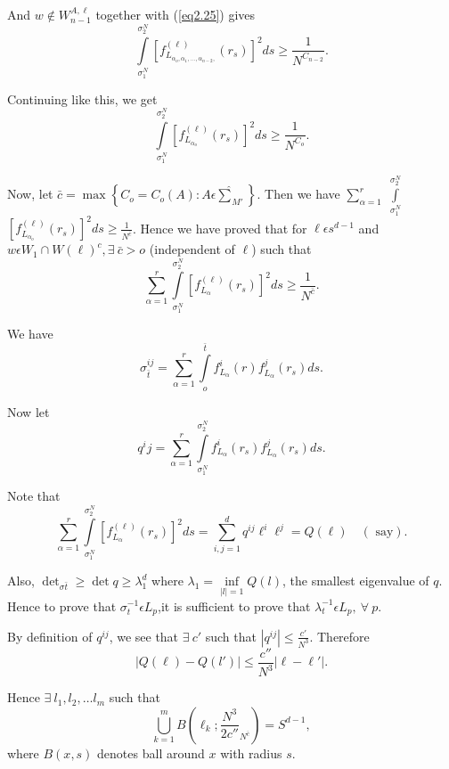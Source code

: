 And $w \notin W^{A,\ell}_{n-1}$ together with (\ref{eq2.25}) gives 
$$
\int\limits^{\sigma_2^N}_{\sigma^N_1} \left[f^{(\ell)}_{L_{\alpha_o, \alpha_1,
    \ldots, \alpha_{n -2},}} (r_s)\right]^2 ds \geq \frac{1}{N^{C_{n-2}}}. 
$$

Continuing like this, we get 
$$
\int\limits^{\sigma_2^N}_{\sigma^N_1} \left[f^{(\ell)}_{L_{\alpha_o}} (r_s)\right]^2
ds \geq \frac{1}{N^{C_{o}}}. 
$$\pageoriginale

Now, let $\bar{c}=\max \left\{ C_o = C_o (A): A \epsilon  \hat{\sum}_{M'}
\right\}$. Then we have $\sum^r_{\alpha=1}$
 $\int\limits^{\sigma_2^N}_{\sigma^N_1}$ $\left[f^{(\ell)}_{L_{\alpha_o}}
  (r_s)\right]^2 ds \geq \frac{1}{N^{\bar{c}}}$. Hence we have proved
that for $\ell 
\epsilon  s^{d-1}$ and $w \epsilon  W_1 \cap W(\ell)^c, \exists~
\bar{c}> o$ (independent of $\ell$) such that 
\begin{equation*}
  \sum^{r}_{\alpha =1}\int\limits^{\sigma_2^N}_{\sigma^N_1}
  \left[f^{(\ell)}_{L_{\alpha}} (r_s) \right]^2 ds \geq
  \frac{1}{N^{\bar{c}}}. \tag{2.26}\label{eq2.26} 
\end{equation*}

We have
$$
\sigma^{ij}_{\bar{t}} = \sum^{r}_{\alpha =1} \int\limits^{\bar
  {t}}_{o}f^i_{L_\alpha}(r) f^j_{L_\alpha}(r_s) ds.
$$ 

Now let 
$$
q^ij= \sum^{r}_{\alpha =1}
\int\limits^{\sigma^N_2}_{\sigma^N_1}f^i_{L_\alpha}(r_s)f^j_{L_\alpha}(r_s)ds. 
$$ 

Note that 
$$
\sum^{r}_{\alpha
  =1}\int\limits^{\sigma_2^N}_{\sigma^N_1} \left[f^{(\ell)}_{L_{\alpha}}
  (r_s)\right]^2 ds = \sum^d_{i,j=1}q^{ij} \ell^{i} \ell^j= Q(\ell)
\quad (\text{ say}). 
$$

Also, $\det_{\sigma \bar{t}} \geq \det q \geq \lambda^d_1$ where
$\lambda_1 = \inf \limits_{|l|=1} Q(l)$, the smallest eigenvalue of
$q$. Hence to prove that $\sigma^{-1}_t \epsilon  L_p$,it is
sufficient to prove that $\lambda^{-1}_t \epsilon  L_p, ~\forall~ p$.  

By definition of $q^{ij}$, we see that $\exists~ c'$ such that
$|q^{ij}| \leq \frac{c'}{N^3}$. Therefore  
\begin{equation*}
  |Q(\ell)-Q(l')| \leq \frac{c''}{N^3} |\ell
  -\ell'|. \tag{2.27}\label{eq2.27}  
\end{equation*}

Hence $\exists~ l_1,l_2, \ldots l_m$ such that 
$$
\bigcup^m_{k=1} B\left(\ell_k; \frac{N^3}{2c''}_{N^{\bar{c}}}\right) =
S^{d-1}, 
$$
where $B(x,s)$ denotes ball around $x$ with radius $s$.

